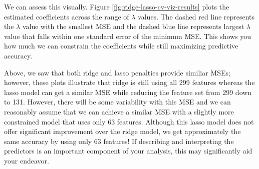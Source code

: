 \documentclass[]{krantz}
\makeatletter
\newenvironment{kframe}{%
\medskip{}
\setlength{\fboxsep}{.8em}
 \def\at@end@of@kframe{}%
 \ifinner\ifhmode%
  \def\at@end@of@kframe{\end{minipage}}%
  \begin{minipage}{\columnwidth}%
 \fi\fi%
 \def\FrameCommand##1{\hskip\@totalleftmargin \hskip-\fboxsep
 \colorbox{shadecolor}{##1}\hskip-\fboxsep
     \hskip-\linewidth \hskip-\@totalleftmargin \hskip\columnwidth}%
 \MakeFramed {\advance\hsize-\width
   \@totalleftmargin\z@ \linewidth\hsize
   \@setminipage}}%
 {\par\unskip\endMakeFramed%
 \at@end@of@kframe}
\newenvironment{block}[1]
  {
  \begin{itemize}
  \renewcommand{\labelitemi}{
    \raisebox{-.7\height}[0pt][0pt]{
      {\setkeys{Gin}{width=3em,keepaspectratio}\texttt{[image: icons/\#1]}}
    }
  }
  \setlength{\fboxsep}{1em}
  \begin{kframe}
  \item
  }
  {
  \end{kframe}
  \end{itemize}
  }
\newenvironment{tip}
  {\begin{block}{tip}}
  {\end{block}}
\makeatother
\begin{document}
We can assess this visually. Figure \ref{fig:ridge-lasso-cv-viz-results} plots the estimated coefficients across the range of \(\lambda\) values. The dashed red line represents the \(\lambda\) value with the smallest MSE and the dashed blue line represents largest \(\lambda\) value that falls within one standard error of the minimum MSE. This shows you how much we can constrain the coefficients while still maximizing predictive accuracy.

\begin{tip}
Above, we saw that both ridge and lasso penalties provide similiar MSEs;
however, these plots illustrate that ridge is still using all 299
features whereas the lasso model can get a similar MSE while reducing
the feature set from 299 down to 131. However, there will be some
variability with this MSE and we can reasonably assume that we can
achieve a similar MSE with a slightly more constrained model that uses
only 63 features. Although this lasso model does not offer significant
improvement over the ridge model, we get approximately the same accuracy
by using only 63 features! If describing and interpreting the predictors
is an important component of your analysis, this may significantly aid
your endeavor.
\end{tip}
\end{document}
